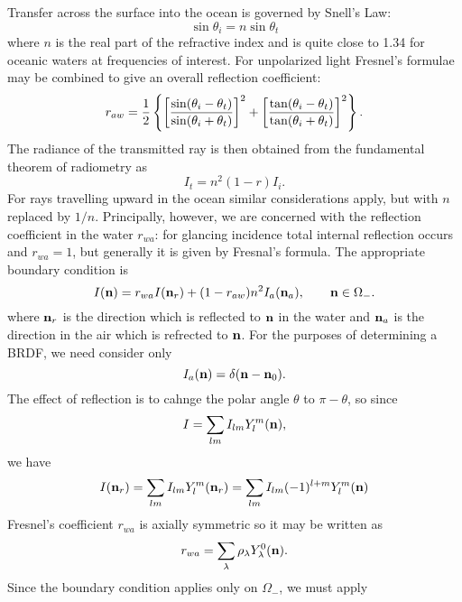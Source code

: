 Transfer across the surface into the ocean is governed by Snell's Law:
\begin{equation}
\sin \theta_i = n \sin \theta_t
\end{equation}
where $n$ is the real part of the refractive index and is quite close to 1.34
for oceanic waters at frequencies of interest. For unpolarized light Fresnel's
formulae may be combined to give an overall reflection coefficient:
\begin{equation}
r_{aw}= {1\over 2} \left \{ \left [ { {\sin (\theta_i -\theta_t) } \over
{\sin (\theta_i +\theta_t)} } \right ]^2 
+ \left [ { {\tan (\theta_i -\theta_t) } \over
{\tan (\theta_i +\theta_t)} } \right ]^2 \right \}.
\end{equation}
The radiance of the transmitted ray is then obtained from the fundamental 
theorem of radiometry as
\begin{equation}
I_t= n^2 (1-r) I_i.
\end{equation}
For rays travelling upward in the ocean similar considerations apply, but
with $n$ replaced by $1/n$. Principally, however, we are concerned with the
reflection coefficient in the water $r_{wa}$: for glancing incidence total
internal reflection occurs and $r_{wa}=1$, but generally it is given by
Fresnal's formula. The appropriate boundary condition is
\begin{equation}
I(\mathbf{n})=r_{wa} I(\mathbf{n}_r) + (1-r_{aw}) n^2 I_a(\mathbf{n}_a), \qquad \mathbf{n} \in \Omega_-.
\end{equation}
where $\mathbf{n}_r$ is the direction which is reflected to $\mathbf{n}$ in the water and
$\mathbf{n}_a$ is the direction in the air which is refrected to $\mathbf{n}$. For the
purposes of determining a BRDF, we need consider only
\begin{equation}
I_a(\mathbf{n})=\delta(\mathbf{n}-\mathbf{n}_0).
\end{equation}
The effect of reflection is to cahnge the polar angle $\theta$ to $\pi-\theta$,
so since 
\begin{equation}
I=\sum_{lm} I_{lm} Y_l^m (\mathbf{n}),
\end{equation}
we have
\begin{equation}
I(\mathbf{n}_r)=\sum_{lm} I_{lm} Y_l^m(\mathbf{n}_r) 
        = \sum_{lm} I_{lm} (-1)^{l+m} Y_l^m(\mathbf{n})
\end{equation}
Fresnel's coefficient $r_{wa}$ is axially symmetric so it may be written as
\begin{equation}
r_{wa}=\sum_\lambda \rho_\lambda Y_\lambda^0(\mathbf{n}).
\end{equation}
Since the boundary condition applies only on $\Omega_-$, we must apply 
